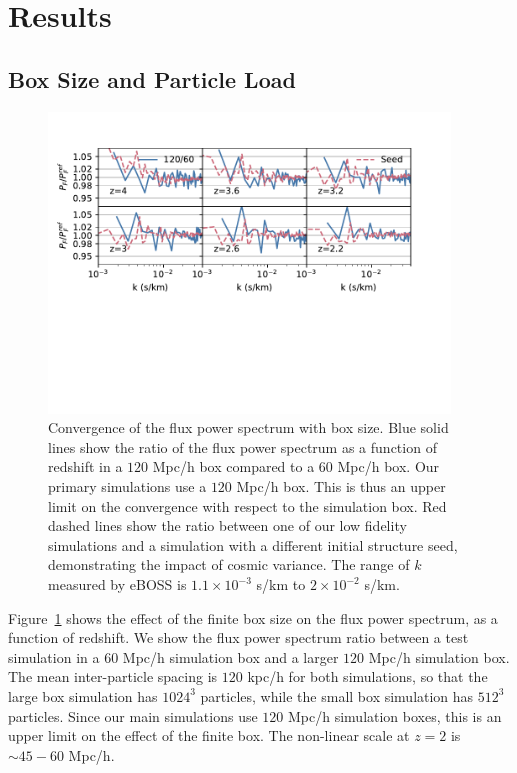 \documentclass[a4paper,11pt]{article}
\newcommand{\Lya}{Lyman-$\alpha$}
\begin{document}
\section{Results}

\subsection{Box Size and Particle Load}
\label{sec:boxsize}

\begin{figure}
\includegraphics[width=0.95\textwidth,trim={0 5cm 1cm 0},clip]{figures/box-convergence.pdf}
 \caption{Convergence of the flux power spectrum with box size. Blue solid lines show the ratio of the flux power spectrum as a function of redshift in a $120$ Mpc/h box compared to a $60$ Mpc/h box. Our primary simulations use a $120$ Mpc/h box. This is thus an upper limit on the convergence with respect to the simulation box. Red dashed lines show the ratio between one of our low fidelity simulations and a simulation with a different initial structure seed, demonstrating the impact of cosmic variance. The range of $k$ measured by eBOSS is $1.1 \times 10^{-3}$ s/km to $2\times 10^{-2}$ s/km.}
 \label{fig:boxsize}
\end{figure}

Figure~\ref{fig:boxsize} shows the effect of the finite box size on the flux power spectrum, as a function of redshift. We show the flux power spectrum ratio between a test simulation in a $60$ Mpc/h simulation box and a larger $120$ Mpc/h simulation box. The mean inter-particle spacing is $120$ kpc/h for both simulations, so that the large box simulation has $1024^3$ particles, while the small box simulation has $512^3$ particles. Since our main simulations use $120$ Mpc/h simulation boxes, this is an upper limit on the effect of the finite box. The non-linear scale at $z=2$ is $\sim 45 - 60$ Mpc/h.
\end{document}
